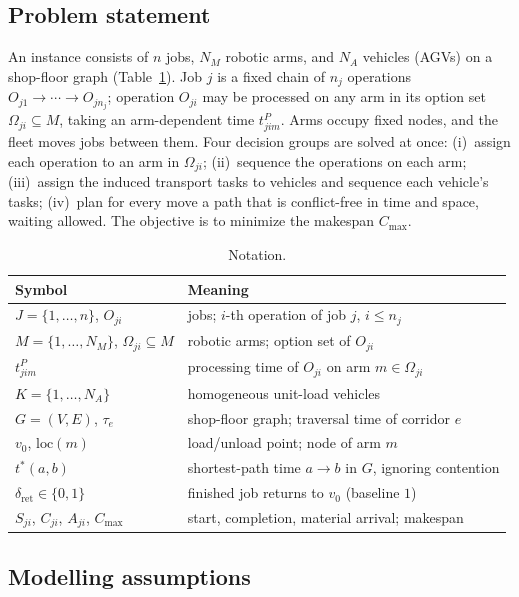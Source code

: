 \documentclass[manuscript,screen,review]{acmart}
\begin{document}
\subsection{Problem statement}

An instance consists of $n$ jobs, $N_M$ robotic arms, and $N_A$ vehicles (AGVs) on a shop-floor graph (Table~\ref{tab:notation}).
Job $j$ is a fixed chain of $n_j$ operations $O_{j1}\to\cdots\to O_{jn_j}$; operation $O_{ji}$ may be processed on any arm in its option set $\Omega_{ji}\subseteq M$, taking an arm-dependent time $t^P_{jim}$.
Arms occupy fixed nodes, and the fleet moves jobs between them.
Four decision groups are solved at once:
(i)~assign each operation to an arm in $\Omega_{ji}$;
(ii)~sequence the operations on each arm;
(iii)~assign the induced transport tasks to vehicles and sequence each vehicle's tasks;
(iv)~plan for every move a path that is conflict-free in time and space, waiting allowed.
The objective is to minimize the makespan $C_{\max}$.

\begin{table}[t]
\caption{Notation.}
\label{tab:notation}
\footnotesize
\begin{tabular}{@{}ll@{}}
\toprule
Symbol & Meaning \\
\midrule
$J=\{1,\dots,n\}$, $O_{ji}$ & jobs; $i$-th operation of job $j$, $i\le n_j$ \\
$M=\{1,\dots,N_M\}$, $\Omega_{ji}\subseteq M$ & robotic arms; option set of $O_{ji}$ \\
$t^P_{jim}$ & processing time of $O_{ji}$ on arm $m\in\Omega_{ji}$ \\
$K=\{1,\dots,N_A\}$ & homogeneous unit-load vehicles \\
$G=(V,E)$, $\tau_e$ & shop-floor graph; traversal time of corridor $e$ \\
$v_0$, $\mathrm{loc}(m)$ & load/unload point; node of arm $m$ \\
$t^{*}(a,b)$ & shortest-path time $a\to b$ in $G$, ignoring contention \\
$\delta_{\mathrm{ret}}\in\{0,1\}$ & finished job returns to $v_0$ (baseline $1$) \\
$S_{ji}$, $C_{ji}$, $A_{ji}$, $C_{\max}$ & start, completion, material arrival; makespan \\
\bottomrule
\end{tabular}
\end{table}

\subsection{Modelling assumptions}
\label{sec:assumptions}
\end{document}
